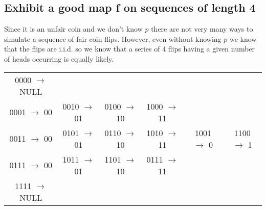 \documentclass[11pt, oneside]{book}   	%
\begin{document}
\subsection{Exhibit a good map f on sequences of length 4}
Since it is an unfair coin and we don't know $p$ there are not very many ways to simulate a sequence of fair coin-flips.  However, even without knowing $p$ we know that the flips are i.i.d. so we know that a series of 4 flips having a given number of heads occurring is equally likely.
\begin{center}
\begin{tabular}{ c | c | c | c | c | c |}
0000 $\rightarrow$ NULL & & & & & \\
0001 $\rightarrow$ 00 & 0010 $\rightarrow$ 01 & 0100 $\rightarrow$ 10 & 1000 $\rightarrow$ 11 & & \\
0011 $\rightarrow$ 00 & 0101 $\rightarrow$ 01 & 0110 $\rightarrow$ 10 & 1010 $\rightarrow$ 11 & 1001 $\rightarrow$ 0 & 1100 $\rightarrow$ 1 \\
0111 $\rightarrow$ 00 & 1011 $\rightarrow$ 01 & 1101 $\rightarrow$ 10 & 0111 $\rightarrow$ 11 & & \\
1111 $\rightarrow$ NULL & & & & &
\end{tabular}
\end{center}
\end{document}
